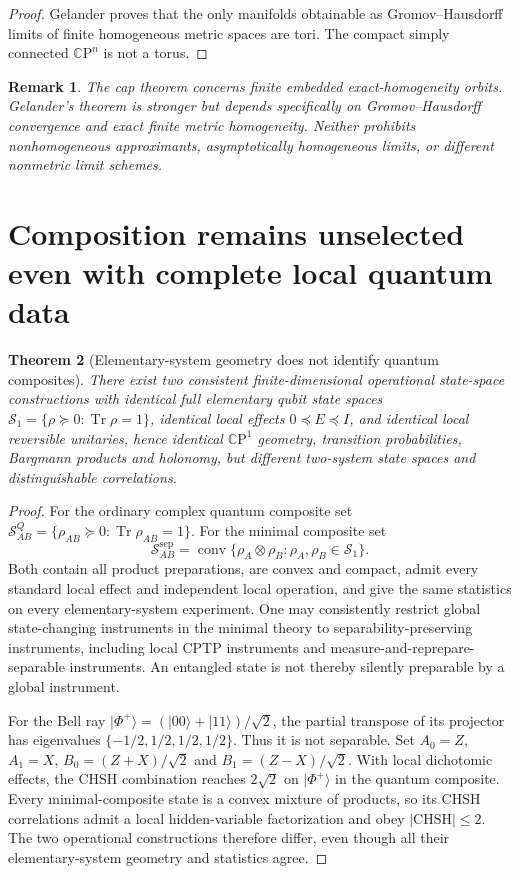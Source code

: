 \documentclass[11pt,letterpaper]{article}
\newtheorem{theorem}{Theorem}
\newtheorem{remark}[theorem]{Remark}
\newcommand{\CP}{\mathbb C\mathrm P}
\begin{document}
\begin{proof}
Gelander \cite{gelander} proves that the only manifolds obtainable as Gromov--Hausdorff limits of finite homogeneous metric spaces are tori. The compact simply connected \(\CP^n\) is not a torus.
\end{proof}
\begin{remark}
The cap theorem concerns finite \emph{embedded} exact-homogeneity orbits. Gelander's theorem is stronger but depends specifically on Gromov--Hausdorff convergence and exact finite metric homogeneity. Neither prohibits nonhomogeneous approximants, asymptotically homogeneous limits, or different nonmetric limit schemes.
\end{remark}

\section{Composition remains unselected even with complete local quantum data}
\begin{theorem}[Elementary-system geometry does not identify quantum composites]\label{thm:composite}
There exist two consistent finite-dimensional operational state-space constructions with identical full elementary qubit state spaces \(\mathcal S_1=\{\rho\succeq0:\operatorname{Tr}\rho=1\}\), identical local effects \(0\preceq E\preceq I\), and identical local reversible unitaries, hence identical \(\CP^1\) geometry, transition probabilities, Bargmann products and holonomy, but different two-system state spaces and distinguishable correlations.
\end{theorem}
\begin{proof}
For the ordinary complex quantum composite set
\(\mathcal S^{Q}_{AB}=\{\rho_{AB}\succeq0:\operatorname{Tr}\rho_{AB}=1\}\). For the minimal composite set
\[
\mathcal S^{\mathrm{sep}}_{AB}=\operatorname{conv}\{\rho_A\otimes\rho_B:\rho_A,\rho_B\in\mathcal S_1\}.
\]
Both contain all product preparations, are convex and compact, admit every standard local effect and independent local operation, and give the same statistics on every elementary-system experiment. One may consistently restrict global state-changing instruments in the minimal theory to separability-preserving instruments, including local CPTP instruments and measure-and-reprepare-separable instruments. An entangled state is not thereby silently preparable by a global instrument.

For the Bell ray \(|\Phi^+\rangle=(|00\rangle+|11\rangle)/\sqrt2\), the partial transpose of its projector has eigenvalues
\(\{-1/2,1/2,1/2,1/2\}\). Thus it is not separable. Set \(A_0=Z\), \(A_1=X\),
\(B_0=(Z+X)/\sqrt2\) and \(B_1=(Z-X)/\sqrt2\).
With local dichotomic effects, the CHSH combination reaches \(2\sqrt2\) on \(|\Phi^+\rangle\) in the quantum composite.
Every minimal-composite state is a convex mixture of products, so its CHSH correlations admit a local hidden-variable factorization and obey \(|\mathrm{CHSH}|\le2\).
The two operational constructions therefore differ, even though all their elementary-system geometry and statistics agree.
\end{proof}
\end{document}
